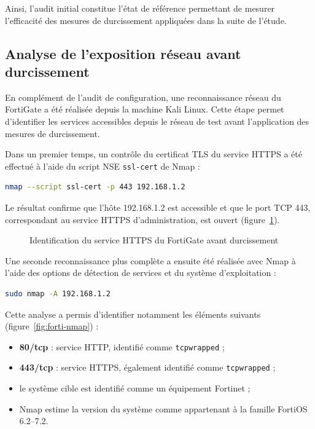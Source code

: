 Ainsi, l'audit initial constitue l'état de référence permettant de mesurer l'efficacité des mesures de durcissement appliquées dans la suite de l'étude.

\subsection{Analyse de l'exposition réseau avant durcissement}

En complément de l'audit de configuration, une reconnaissance réseau du FortiGate a été réalisée depuis la machine Kali Linux. Cette étape permet d'identifier les services accessibles depuis le réseau de test avant l'application des mesures de durcissement.

Dans un premier temps, un contrôle du certificat TLS du service HTTPS a été effectué à l'aide du script NSE \texttt{ssl-cert} de Nmap :

\begin{lstlisting}[language=bash]
nmap --script ssl-cert -p 443 192.168.1.2
\end{lstlisting}

Le résultat confirme que l'hôte 192.168.1.2 est accessible et que le port TCP 443, correspondant au service HTTPS d'administration, est ouvert (figure~\ref{fig:forti-https}).

\begin{figure}[htbp]
\centering
{}
\caption{Identification du service HTTPS du FortiGate avant durcissement}
\label{fig:forti-https}
\end{figure}

Une seconde reconnaissance plus complète a ensuite été réalisée avec Nmap à l'aide des options de détection de services et du système d'exploitation :

\begin{lstlisting}[language=bash]
sudo nmap -A 192.168.1.2
\end{lstlisting}

Cette analyse a permis d'identifier notamment les éléments suivants (figure~\ref{fig:forti-nmap}) :
\begin{itemize}
  \item \textbf{80/tcp} : service HTTP, identifié comme \texttt{tcpwrapped} ;
  \item \textbf{443/tcp} : service HTTPS, également identifié comme \texttt{tcpwrapped} ;
  \item le système cible est identifié comme un équipement Fortinet ;
  \item Nmap estime la version du système comme appartenant à la famille FortiOS 6.2--7.2.
\end{itemize}

